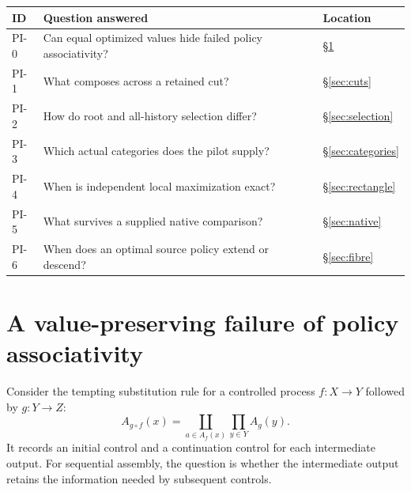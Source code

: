 \documentclass[11pt]{article}
\theoremstyle{definition}
\begin{document}
\begin{center}
\small
\begin{tabularx}{\textwidth}{@{}lXl@{}}
\toprule
ID & Question answered & Location\\
\midrule
PI-0 & Can equal optimized values hide failed policy associativity? & \S\ref{sec:obstruction}\\
PI-1 & What composes across a retained cut? & \S\ref{sec:cuts}\\
PI-2 & How do root and all-history selection differ? & \S\ref{sec:selection}\\
PI-3 & Which actual categories does the pilot supply? & \S\ref{sec:categories}\\
PI-4 & When is independent local maximization exact? & \S\ref{sec:rectangle}\\
PI-5 & What survives a supplied native comparison? & \S\ref{sec:native}\\
PI-6 & When does an optimal source policy extend or descend? & \S\ref{sec:fibre}\\
\bottomrule
\end{tabularx}
\end{center}

\section{A value-preserving failure of policy associativity}
\label{sec:obstruction}
Consider the tempting substitution rule for a controlled process
\(f:X\to Y\) followed by \(g:Y\to Z\):
\begin{equation}
 A_{g\circ f}(x)
   =\coprod_{a\in A_f(x)}\prod_{y\in Y} A_g(y).
 \label{eq:naive}
\end{equation}
It records an initial control and a continuation control for each
intermediate output. For sequential assembly, the question is whether the
intermediate output retains the information needed by subsequent controls.
\end{document}
